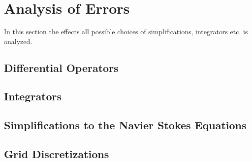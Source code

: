 \chapter{Analysis of Errors}\label{chapter:introduction}
In this section the effects all possible choices of simplifications, integrators etc. is analyzed.
\section{Differential Operators}
\section{Integrators}
\section{Simplifications to the Navier Stokes Equations} %
\section{Grid Discretizations}%
